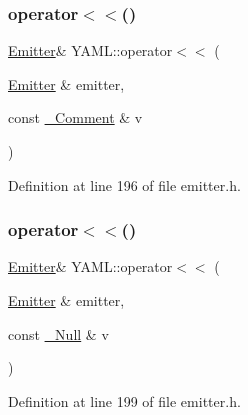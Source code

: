 \subsubsection{\texorpdfstring{operator$<$$<$()}{operator<<()}\hspace{0.1cm}{\footnotesize\ttfamily [19/35]}}
{\footnotesize\ttfamily \mbox{\hyperlink{class_y_a_m_l_1_1_emitter}{Emitter}}\& Y\+A\+M\+L\+::operator$<$$<$ (\begin{DoxyParamCaption}\item[{\mbox{\hyperlink{class_y_a_m_l_1_1_emitter}{Emitter}} \&}]{emitter,  }\item[{const \mbox{\hyperlink{struct_y_a_m_l_1_1___comment}{\+\_\+\+Comment}} \&}]{v }\end{DoxyParamCaption})\hspace{0.3cm}{\ttfamily [inline]}}



Definition at line 196 of file emitter.\+h.

\mbox{\label{namespace_y_a_m_l_a8c8d0d55ea1e4509615dd64a9f13a570}} 
\subsubsection{\texorpdfstring{operator$<$$<$()}{operator<<()}\hspace{0.1cm}{\footnotesize\ttfamily [20/35]}}
{\footnotesize\ttfamily \mbox{\hyperlink{class_y_a_m_l_1_1_emitter}{Emitter}}\& Y\+A\+M\+L\+::operator$<$$<$ (\begin{DoxyParamCaption}\item[{\mbox{\hyperlink{class_y_a_m_l_1_1_emitter}{Emitter}} \&}]{emitter,  }\item[{const \mbox{\hyperlink{struct_y_a_m_l_1_1___null}{\+\_\+\+Null}} \&}]{v }\end{DoxyParamCaption})\hspace{0.3cm}{\ttfamily [inline]}}



Definition at line 199 of file emitter.\+h.

\mbox{\label{namespace_y_a_m_l_aadf091e7c1f0e1be6e7f74e453a51dc4}} 
